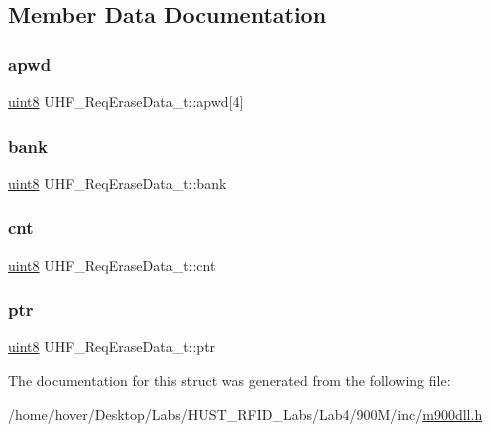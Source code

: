 \subsection{Member Data Documentation}
\mbox{\label{struct_u_h_f___req_erase_data__t_ad5d8ea8552fdbcc2f46c6eb11748a02a}} 
\subsubsection{\texorpdfstring{apwd}{apwd}}
{\footnotesize\ttfamily \mbox{\hyperlink{m900dll_8h_adde6aaee8457bee49c2a92621fe22b79}{uint8}} U\+H\+F\+\_\+\+Req\+Erase\+Data\+\_\+t\+::apwd\mbox{[}4\mbox{]}}

\mbox{\label{struct_u_h_f___req_erase_data__t_a994d9032a9b53866b65eed203ee34e8c}} 
\subsubsection{\texorpdfstring{bank}{bank}}
{\footnotesize\ttfamily \mbox{\hyperlink{m900dll_8h_adde6aaee8457bee49c2a92621fe22b79}{uint8}} U\+H\+F\+\_\+\+Req\+Erase\+Data\+\_\+t\+::bank}

\mbox{\label{struct_u_h_f___req_erase_data__t_acf3ac6dbb06f332273851d0bec9d4e7e}} 
\subsubsection{\texorpdfstring{cnt}{cnt}}
{\footnotesize\ttfamily \mbox{\hyperlink{m900dll_8h_adde6aaee8457bee49c2a92621fe22b79}{uint8}} U\+H\+F\+\_\+\+Req\+Erase\+Data\+\_\+t\+::cnt}

\mbox{\label{struct_u_h_f___req_erase_data__t_a42a12cb1a29b01e4f14493734780ba12}} 
\subsubsection{\texorpdfstring{ptr}{ptr}}
{\footnotesize\ttfamily \mbox{\hyperlink{m900dll_8h_adde6aaee8457bee49c2a92621fe22b79}{uint8}} U\+H\+F\+\_\+\+Req\+Erase\+Data\+\_\+t\+::ptr}



The documentation for this struct was generated from the following file\+:\begin{DoxyCompactItemize}
\item 
/home/hover/\+Desktop/\+Labs/\+H\+U\+S\+T\+\_\+\+R\+F\+I\+D\+\_\+\+Labs/\+Lab4/900\+M/inc/\mbox{\hyperlink{m900dll_8h}{m900dll.\+h}}\end{DoxyCompactItemize}
